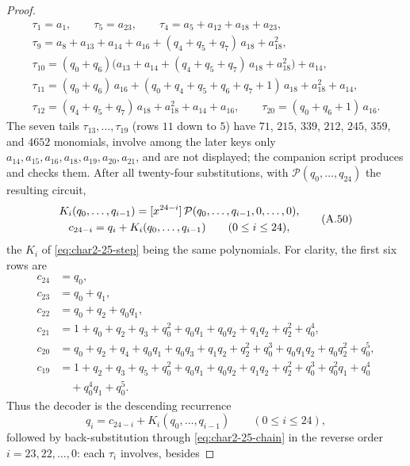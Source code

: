 \begin{proof}
\[\begin{gathered}
\tau_1=a_1,\qquad \tau_5=a_{23},\qquad
\tau_4=a_5+a_{12}+a_{18}+a_{23},\\
\tau_9=a_8+a_{13}+a_{14}+a_{16}+(q_4+q_5+q_7)\,a_{18}+a_{18}^2,\\
\tau_{10}=(q_0+q_6)\bigl(a_{13}+a_{14}+(q_4+q_5+q_7)\,a_{18}+a_{18}^2\bigr)+a_{14},\\
\tau_{11}=(q_0+q_6)\,a_{16}+(q_0+q_4+q_5+q_6+q_7+1)\,a_{18}+a_{18}^2+a_{14},\\
\tau_{12}=(q_4+q_5+q_7)\,a_{18}+a_{18}^2+a_{14}+a_{16},\qquad
\tau_{20}=(q_0+q_6+1)\,a_{16}.
\end{gathered}                                                     \tag{A.49}\label{eq:char2-25-tails}
\]
The seven tails $\tau_{13},\ldots,\tau_{19}$ (rows $11$ down to $5$) have
$71$, $215$, $339$, $212$, $245$, $359$, and $4652$ monomials, involve
among the later keys only $a_{14},a_{15},a_{16},a_{18},a_{19},a_{20},a_{21}$,
and are not displayed; the companion script produces and checks them.
After all twenty-four substitutions, with $\mathcal P(q_0,\ldots,q_{24})$
the resulting circuit,
\[
\begin{gathered}
 K_i(q_0,\ldots,q_{i-1})
  =\coeff{\mathcal P(q_0,\ldots,q_{i-1},0,\ldots,0)}{24-i},\\
 c_{24-i}=q_i+K_i(q_0,\ldots,q_{i-1})\qquad(0\le i\le24),
\end{gathered}                                                     \tag{A.50}\label{eq:char2-25-triangular}
\]
the $K_i$ of \eqref{eq:char2-25-step} being the same polynomials.  For
clarity, the first six rows are
\[
\begin{aligned}
c_{24}&=q_0,\\
c_{23}&=q_0+q_1,\\
c_{22}&=q_0+q_2+q_0q_1,\\
c_{21}&=1+q_0+q_2+q_3+q_0^2+q_0q_1+q_0q_2+q_1q_2+q_2^2+q_0^4,\\
c_{20}&=q_0+q_2+q_4+q_0q_1+q_0q_3+q_1q_2+q_2^2+q_0^3+q_0q_1q_2+q_0q_2^2+q_0^5,\\
c_{19}&=1+q_2+q_3+q_5+q_0^2+q_0q_1+q_0q_2+q_1q_2+q_2^2+q_0^3+q_0^2q_1+q_0^4\\
      &\quad+q_0^4q_1+q_0^5.
\end{aligned}                                                     \tag{A.51}\label{eq:char2-25-first-rows}
\]
Thus the decoder is the descending recurrence
\[
 q_i=c_{24-i}+K_i(q_0,\ldots,q_{i-1})\qquad(0\le i\le24),        \tag{A.52}\label{eq:char2-25-decoder}
\]
followed by back-substitution through \eqref{eq:char2-25-chain} in the
reverse order $i=23,22,\ldots,0$: each $\tau_i$ involves, besides

\end{proof}
